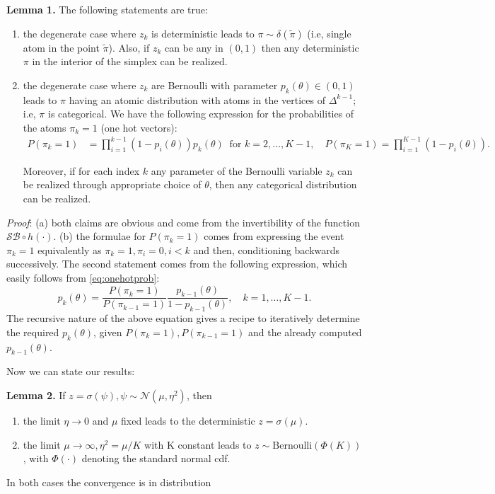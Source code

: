 \documentclass{article}
\begin{document}
\textbf{Lemma 1.}  The following statements are true:
\begin{enumerate} \item the degenerate case where  $z_k$ is deterministic leads to $\pi\sim \delta(\tilde{\pi})$  (i.e, single atom in the point $\tilde{\pi}$). Also, if $z_k$ can be any in $(0,1)$ then any deterministic $\pi$ in the interior of the simplex can be realized.
\item the degenerate case where  $z_k$ are Bernoulli with parameter $p_k(\theta) \in (0,1)$ leads to $\pi$ having an atomic distribution with atoms in the vertices of $\Delta^{k-1}$; i.e, $\pi$ is categorical. We have the following expression for the probabilities of the atoms $\pi_k=1$ (one hot vectors):
\begin{align}
\label{eq:onehotprob}
P(\pi_k =1)&= \prod_{i=1}^{k-1} (1-p_i(\theta)) p_k(\theta)  \;\; \text{for } k=2, \ldots, K-1, \quad P(\pi_K =1) = \prod_{i=1}^{K-1} (1-p_i(\theta)).
\end{align}

Moreover, if for each index $k$ any parameter of the Bernoulli variable $z_k$ can be realized through appropriate choice of $\theta$, then any categorical distribution can be realized.

\end{enumerate}
\textit{Proof}: (a) both claims are obvious and come from the invertibility of the function $\mathcal{SB} \circ h (\cdot)$. (b) the formulae for $P(\pi_k =1)$ comes from expressing the event $\pi_k=1$ equivalently as $\pi_k=1,\pi_i=0, i<k$ and then, conditioning backwards successively. The second statement comes from the following expression, which easily follows  from \eqref{eq:onehotprob}:
$$ p_k(\theta)=\frac{P(\pi_k =1)}{P(\pi_{k-1} =1)}\frac{p_{k-1}(\theta)}{1-p_{k-1}(\theta)},\quad k =1,\ldots, K-1.$$
The recursive nature of the above equation gives a recipe to iteratively determine the required $p_k(\theta)$, given  $P(\pi_k =1), P(\pi_{k-1} =1)$ and the already computed $p_{k-1}(\theta)$.


Now we can state our results:

\textbf{Lemma 2.} If $z=\sigma(\psi),\psi\sim\mathcal{N}(\mu,\eta^2)$, then
\begin{enumerate} \item the  limit $\eta\rightarrow 0$ and $\mu$ fixed leads to the deterministic $z=\sigma(\mu)$. 
\item the limit $\mu\rightarrow \infty, \eta^2=\mu/K$ with K constant leads to $z\sim \text{Bernoulli}(\Phi(K))$, with $\Phi(\cdot)$ denoting the standard normal cdf.
\end{enumerate} In both cases the convergence is in distribution 
\end{document}
